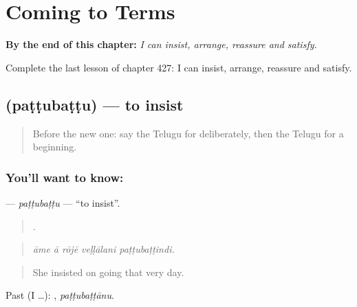 
\chapter{Coming to Terms}
\label{ch:te-coming-to-terms}

\begin{chapteropening}
\textbf{By the end of this chapter:} \emph{I can insist, arrange, reassure and satisfy.}

Complete the last lesson of chapter 427: I can insist, arrange, reassure and satisfy.
\end{chapteropening}

\section[\texorpdfstring{\te{పట్టుబట్టు} (paṭṭubaṭṭu)}{పట్టుబట్టు (paṭṭubaṭṭu)}]{ (paṭṭubaṭṭu) — to insist}

\label{lesson:TE-C427-pattubattu}



\begin{quote}
Before the new one: say the Telugu for deliberately, then the Telugu for a beginning.
\end{quote}

\subsection*{You'll want to know: }
\textbf{} — \emph{paṭṭubaṭṭu} — \textquotedblleft{}to insist\textquotedblright{}.

\begin{quote}
    .
\end{quote}

\begin{quote}
\emph{āme ā rōjē veḷḷālani paṭṭubaṭṭindi.}
\end{quote}

\begin{quote}
She insisted on going that very day.
\end{quote}

Past (I …): , \emph{paṭṭubaṭṭānu}.

